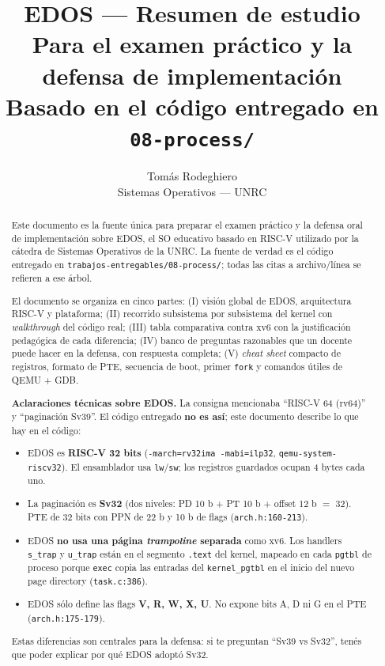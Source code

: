 \documentclass[11pt,a4paper]{article}
\title{
    \vspace{-2.5em}
    \textbf{EDOS --- Resumen de estudio} \\[0.3em]
    \large Para el examen práctico y la defensa de implementación \\
    \small Basado en el código entregado en \texttt{08-process/}
}
\author{
    Tomás Rodeghiero \\
    \small Sistemas Operativos --- UNRC
}
\date{}
\begin{document}
\maketitle

\begin{abstract}
\noindent
Este documento es la fuente única para preparar el examen práctico
y la defensa oral de implementación sobre EDOS, el SO educativo
basado en RISC-V utilizado por la cátedra de Sistemas Operativos de
la UNRC. La fuente de verdad es el código entregado en
\texttt{trabajos-entregables/08-process/}; todas las citas a
archivo/línea se refieren a ese árbol.

El documento se organiza en cinco partes: (I) visión global de EDOS,
arquitectura RISC-V y plataforma; (II) recorrido subsistema por
subsistema del kernel con \emph{walkthrough} del código real; (III)
tabla comparativa contra xv6 con la justificación pedagógica de
cada diferencia; (IV) banco de preguntas razonables que un docente
puede hacer en la defensa, con respuesta completa; (V)
\emph{cheat sheet} compacto de registros, formato de PTE, secuencia
de boot, primer \texttt{fork} y comandos útiles de QEMU + GDB.

\begin{importante}
\textbf{Aclaraciones técnicas sobre EDOS.} La consigna mencionaba
``RISC-V 64 (rv64)'' y ``paginación Sv39''. El código entregado
\textbf{no es así}; este documento describe lo que hay en el código:
\begin{itemize}[nosep,leftmargin=*]
    \item EDOS es \textbf{RISC-V 32 bits} (\texttt{-march=rv32ima
        -mabi=ilp32}, \texttt{qemu-system-riscv32}). El ensamblador
        usa \texttt{lw}/\texttt{sw}; los registros guardados ocupan
        4 bytes cada uno.
    \item La paginación es \textbf{Sv32} (dos niveles: PD 10 b +
        PT 10 b + offset 12 b $=$ 32). PTE de 32 bits con PPN de
        22 b y 10 b de flags (\texttt{arch.h:160-213}).
    \item EDOS \textbf{no usa una página \emph{trampoline} separada}
        como xv6. Los handlers \texttt{s\_trap} y \texttt{u\_trap}
        están en el segmento \texttt{.text} del kernel, mapeado en
        cada \texttt{pgtbl} de proceso porque \texttt{exec} copia
        las entradas del \texttt{kernel\_pgtbl} en el inicio del
        nuevo page directory (\texttt{task.c:386}).
    \item EDOS sólo define las flags \textbf{V, R, W, X, U}. No
        expone bits A, D ni G en el PTE (\texttt{arch.h:175-179}).
\end{itemize}
Estas diferencias son centrales para la defensa: si te preguntan
``Sv39 vs Sv32'', tenés que poder explicar por qué EDOS adoptó
Sv32.
\end{importante}
\end{abstract}
\end{document}
